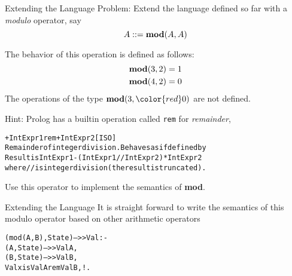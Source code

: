 \documentclass{beamer}
\begin{document}
\begin{frame}[fragile]{Extending the Language}
\small
Problem: Extend the language defined so far with a {\em modulo} operator, say 
\[
A ::= {\bf mod}(A,A)
\]

The behavior of
this operation is defined as follows:
\begin{eqnarray*}
{\bf mod}(3,2) = 1\\
{\bf mod}(4,2) = 0
\end{eqnarray*}
The operations of the type ${\bf mod}(3,{\color{red}0})$ are not defined.

\vspace{.1in}
Hint: Prolog has a builtin operation called {\tt rem} for {\em remainder},
{\scriptsize
\begin{alltt}
+IntExpr1 rem +IntExpr2                                           [ISO]
    Remainder of integer division.  Behaves as if defined by
    Result is IntExpr1 - (IntExpr1 // IntExpr2)  * IntExpr2 
    where // is integer division (the result is truncated).
\end{alltt}
}
Use this operator to implement the semantics of {\bf mod}.
\end{frame}

\begin{frame}[fragile]{Extending the Language}
\small
It is straight forward to write the semantics of this modulo operator
based on other arithmetic operators
\begin{alltt}\tiny
({\color{red}mod}(A,B),State) -->> Val :-       % modulo
     (A,State) -->> ValA,
     (B,State) -->> ValB,
     Val xis ValA {\color{red}rem} ValB,!.
\end{alltt}

\end{frame}
\end{document}
